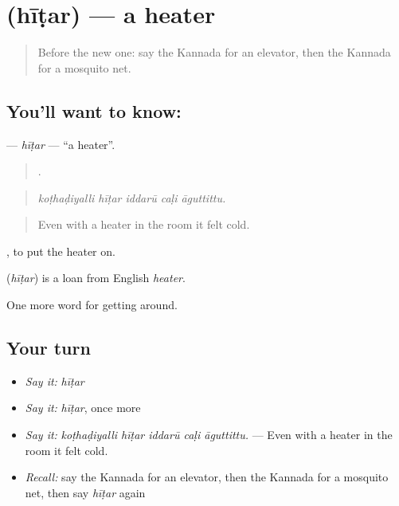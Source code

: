 \section[\texorpdfstring{\kn{ಹೀಟರ್} (hīṭar)}{ಹೀಟರ್ (hīṭar)}]{ (hīṭar) — a heater}

\label{lesson:KA-C462-hitar}



\begin{quote}
Before the new one: say the Kannada for an elevator, then the Kannada for a mosquito net.
\end{quote}

\subsection*{You'll want to know: }
\textbf{} — \emph{hīṭar} — \textquotedblleft{}a heater\textquotedblright{}.

\begin{quote}
    .
\end{quote}

\begin{quote}
\emph{koṭhaḍiyalli hīṭar iddarū caḷi āguttittu.}
\end{quote}

\begin{quote}
Even with a heater in the room it felt cold.
\end{quote}

 , to put the heater on.

\begin{cousinweb}
\textbf{} (\emph{hīṭar}) is a loan from English \emph{heater}.
\end{cousinweb}

\begin{grammarlens}[title={What you've built}]
One more word for getting around.
\end{grammarlens}

\subsection*{Your turn}
\begin{itemize}
\raggedright
  \item \emph{Say it:} \emph{hīṭar}
  \item \emph{Say it:} \emph{hīṭar}, once more
  \item \emph{Say it:} \emph{koṭhaḍiyalli hīṭar iddarū caḷi āguttittu.} — Even with a heater in the room it felt cold.
  \item \emph{Recall:} say the Kannada for an elevator, then the Kannada for a mosquito net, then say \emph{hīṭar} again
\end{itemize}

